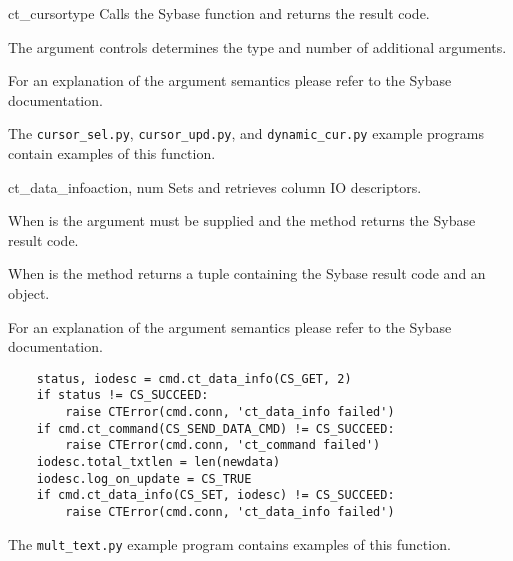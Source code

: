 \begin{methoddesc}[CS_COMMAND]{ct_cursor}{type \optional{, \ldots}}
Calls the Sybase  function and returns the
result code.

The  argument controls determines the type and number of
additional arguments.









For an explanation of the argument semantics please refer to the
Sybase documentation.

The \texttt{cursor_sel.py}, \texttt{cursor_upd.py}, and
\texttt{dynamic_cur.py} example programs contain examples of this
function.
\end{methoddesc}

\begin{methoddesc}[CS_COMMAND]{ct_data_info}{action, num }
Sets and retrieves column IO descriptors.

When  is  the  argument
must be supplied and the method returns the Sybase result code.

When  is  the method returns a tuple
containing the Sybase result code and an  object.

For an explanation of the argument semantics please refer to the
Sybase documentation.

\begin{verbatim}
    status, iodesc = cmd.ct_data_info(CS_GET, 2)
    if status != CS_SUCCEED:
        raise CTError(cmd.conn, 'ct_data_info failed')
    if cmd.ct_command(CS_SEND_DATA_CMD) != CS_SUCCEED:
        raise CTError(cmd.conn, 'ct_command failed')
    iodesc.total_txtlen = len(newdata)
    iodesc.log_on_update = CS_TRUE
    if cmd.ct_data_info(CS_SET, iodesc) != CS_SUCCEED:
        raise CTError(cmd.conn, 'ct_data_info failed')
\end{verbatim}

The \texttt{mult_text.py} example program contains examples of this
function.
\end{methoddesc}

